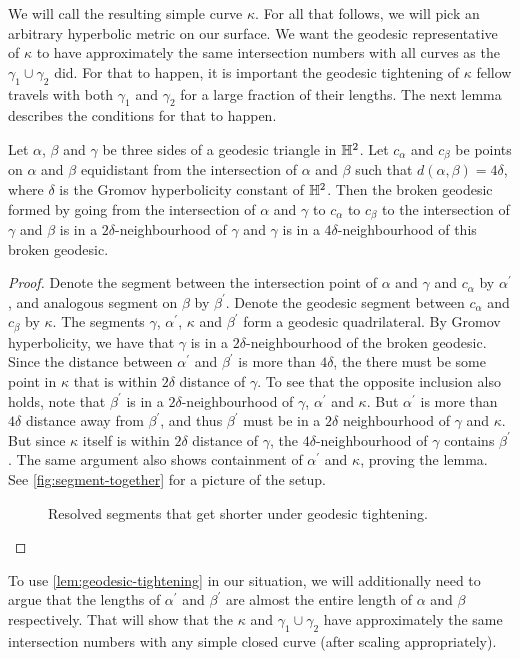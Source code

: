 \documentclass[12pt, reqno]{amsart}
\begin{document}
We will call the resulting simple curve $\kappa$.
For all that follows, we will pick an arbitrary hyperbolic metric on our surface.
We want the geodesic representative of $\kappa$ to have approximately the same intersection numbers with all curves as the $\gamma_1 \cup \gamma_2$ did.
For that to happen, it is important the geodesic tightening of $\kappa$ fellow travels with both $\gamma_1$ and $\gamma_2$ for a large fraction of their lengths.
The next lemma describes the conditions for that to happen.
\begin{lemma}
  \label{lem:geodesic-tightening}
  Let $\alpha$, $\beta$ and $\gamma$ be three sides of a geodesic triangle in $\mathbb{H}^2$.
  Let $c_\alpha$ and $c_{\beta}$ be points on $\alpha$ and $\beta$ equidistant from the intersection of $\alpha$ and $\beta$ such that $d(\alpha, \beta) = 4 \delta$, where $\delta$ is the Gromov hyperbolicity constant of $\mathbb{H}^2$.
  Then the broken geodesic formed by going from the intersection of $\alpha$ and $\gamma$ to $c_{\alpha}$ to $c_{\beta}$ to the intersection of $\gamma$ and $\beta$ is in a $2\delta$-neighbourhood of $\gamma$ and $\gamma$ is in a $4\delta$-neighbourhood of this broken geodesic.
\end{lemma}
\begin{proof}
  Denote the segment between the intersection point of $\alpha$ and $\gamma$ and $c_{\alpha}$ by $\alpha^{\prime}$, and analogous segment on $\beta$ by $\beta^{\prime}$.
  Denote the geodesic segment between $c_{\alpha}$ and $c_{\beta}$ by $\kappa$.
  The segments $\gamma$, $\alpha^{\prime}$, $\kappa$ and $\beta^{\prime}$ form a geodesic quadrilateral.
  By Gromov hyperbolicity, we have that $\gamma$ is in a $2\delta$-neighbourhood of the broken geodesic.
  Since the distance between $\alpha^{\prime}$ and $\beta^{\prime}$ is more than $4 \delta$, the there must be some point in $\kappa$ that is within $2 \delta$ distance of $\gamma$.
  To see that the opposite inclusion also holds, note that $\beta^{\prime}$ is in a $2\delta$-neighbourhood of $\gamma$, $\alpha^{\prime}$ and $\kappa$.
  But $\alpha^{\prime}$ is more than $4 \delta$ distance away from $\beta^{\prime}$, and thus $\beta^{\prime}$ must be in a $2\delta$ neighbourhood of $\gamma$ and $\kappa$.
  But since $\kappa$ itself is within $2\delta$ distance of $\gamma$, the $4\delta$-neighbourhood of $\gamma$ contains $\beta^{\prime}$.
  The same argument also shows containment of $\alpha^{\prime}$ and $\kappa$, proving the lemma.
  See \autoref{fig:segment-together} for a picture of the setup.
  \begin{figure}[h]
    \centering
    \caption{Resolved segments that get shorter under geodesic tightening.}
    \label{fig:segment-together}
  \end{figure}
\end{proof}
To use \autoref{lem:geodesic-tightening} in our situation, we will additionally need to argue that the lengths of $\alpha^{\prime}$ and $\beta^{\prime}$ are almost the entire length of $\alpha$ and $\beta$ respectively.
That will show that the $\kappa$ and $\gamma_1 \cup \gamma_2$ have approximately the same intersection numbers with any simple closed curve (after scaling appropriately).
\end{document}
